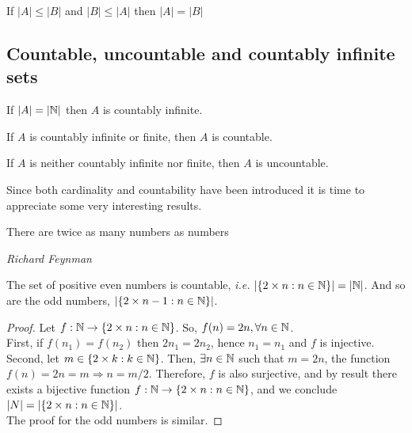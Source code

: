 \begin{theorem}
    If $|A| \leq |B|$ and $|B| \leq |A|$ then $|A| = |B|$
\end{theorem}

\subsection{Countable, uncountable and countably infinite sets}

\begin{definition}
    If $|A| = |\mathbb{N}|$ then $A$ is countably infinite.
\end{definition}

\begin{definition}
    If $A$ is countably infinite or finite, then $A$ is countable.
\end{definition}

\begin{definition}
    If $A$ is neither countably infinite nor finite, then $A$ is uncountable.
\end{definition}

Since both cardinality and countability have been introduced it is time to appreciate some very interesting results.

\epigraph{There are twice as many numbers as numbers}{\textit{Richard Feynman}}

\begin{theorem}
    The set of positive even numbers is countable, \emph{i.e.} $|\{ 2\times n: n \in \mathbb{N}\}| = |\mathbb{N}|$. And so are the odd numbers, $|\{ 2\times n - 1: n \in \mathbb{N}\}|$.
\end{theorem}

\begin{proof}
    Let $f: \mathbb{N} \to \{2 \times n: n \in \mathbb{N} \}$. So, $f(n) = 2n, \forall n \in \mathbb{N}$. \\
    First, if $f(n_1) = f(n_2)$ then $2n_1 = 2n_2$, hence $n_1 = n_1$ and $f$ is injective. \\
    Second, let $m \in \{ 2\times k: k \in \mathbb{N}\}$. Then, $\exists n \in \mathbb{N}$ such that $m = 2n$, the function $f(n) = 2n = m \Rightarrow n = m/2$. Therefore, $f$ is also surjective, and by result there exists a bijective function $f: \mathbb{N} \to \{2 \times n: n \in \mathbb{N} \}$, and we conclude $|N| = |\{ 2\times n: n \in \mathbb{N}\}|$. \\
    The proof for the odd numbers is similar.
\end{proof}

